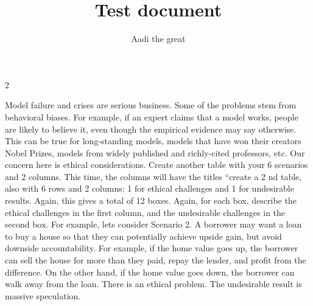 \documentclass{article}
\title{Test document}
\author{Aadi the great}
\begin{document}
\begin{multicols}{2}

\maketitle

Model failure and crises are serious business. Some of the problems stem from
behavioral biases. For example, if an expert claims that a model works, people are likely
to believe it, even though the empirical evidence may say otherwise. This can be true
for long-standing models, models that have won their creators Nobel Prizes, models
from widely published and richly-cited professors, etc.
Our concern here is ethical considerations. Create another table with your 6 scenarios
and 2 columns. This time, the columns will have the titles “create a 2
nd
table, also with 6
rows and 2 columns: 1 for ethical challenges and 1 for undesirable
results. Again, this gives a total of 12 boxes. Again, for each box, describe the ethical
challenges in the first column, and the undesirable challenges in the second box.
For example, lets consider Scenario 2. A borrower may want a loan to buy a house so
that they can potentially achieve upside gain, but avoid downside accountability. For
example, if the home value goes up, the borrower can sell the house for more than they
paid, repay the lender, and profit from the difference. On the other hand, if the home
value goes down, the borrower can walk away from the loan. There is an ethical
problem. The undesirable result is massive speculation.
\end{multicols}
\end{document}
